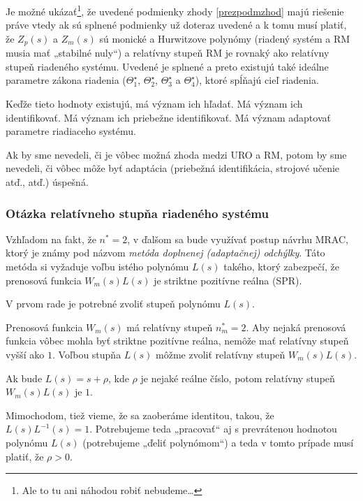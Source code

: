 \documentclass[a4paper, 10pt, ]{article}
\begin{document}
Je možné ukázať\footnote{Ale to tu ani náhodou robiť nebudeme\ldots}, že uvedené podmienky zhody \eqref{prezpodmzhod} majú riešenie práve vtedy ak sú splnené podmienky už doteraz uvedené a k tomu musí platiť, že $Z_p(s)$ a $Z_m(s)$ sú monické a Hurwitzove polynómy (riadený systém a RM musia mať „stabilné nuly“) a relatívny stupeň RM je rovnaký ako relatívny stupeň riadeného systému. Uvedené je splnené a preto existujú také ideálne parametre zákona riadenia ($\Theta_1^\star$, $\Theta_2^\star$, $\Theta_3^\star$ a $\Theta_4^\star$), ktoré spĺňajú cieľ riadenia.

Keďže tieto hodnoty existujú, má význam ich hľadať. Má význam ich identifikovať. Má význam ich priebežne identifikovať. Má význam adaptovať parametre riadiaceho systému.

Ak by sme nevedeli, či je vôbec možná zhoda medzi URO a RM, potom by sme nevedeli, či vôbec môže byť adaptácia (priebežná identifikácia, strojové učenie atď., atď.) úspešná.










\subsubsection{Otázka relatívneho stupňa riadeného systému}

Vzhľadom na fakt, že $n^* = 2$, v ďalšom sa bude využívať postup návrhu MRAC, ktorý je známy pod názvom \emph{metóda doplnenej (adaptačnej) odchýlky}. Táto metóda si vyžaduje voľbu istého polynómu $L(s)$ takého, ktorý zabezpečí, že prenosová funkcia $W_m(s)L(s)$ je striktne pozitívne reálna (SPR).

V prvom rade je potrebné zvoliť stupeň polynómu $L(s)$.

Prenosová funkcia $W_m(s)$ má relatívny stupeň $n_m^* = 2$. Aby nejaká prenosová funkcia vôbec mohla byť striktne pozitívne reálna, nemôže mať relatívny stupeň vyšší ako $1$. Voľbou stupňa $L(s)$ môžme zvoliť relatívny stupeň $W_m(s)L(s)$.

Ak bude $L(s) = s + \rho$, kde $\rho$ je nejaké reálne číslo, potom relatívny stupeň $W_m(s)L(s)$ je $1$.

Mimochodom, tiež vieme, že sa zaoberáme identitou, takou, že $L(s)L^{-1}(s) = 1$. Potrebujeme teda „pracovať“ aj s prevrátenou hodnotou polynómu $L(s)$ (potrebujeme „ďeliť polynómom“) a teda v tomto prípade musí platiť, že $\rho > 0$.
\end{document}
